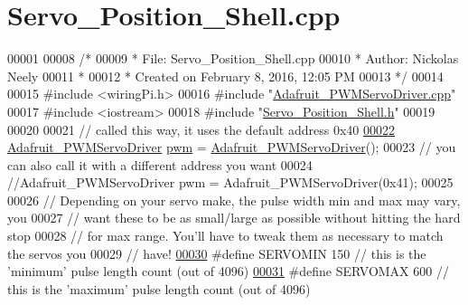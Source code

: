 \hypertarget{Servo__Position__Shell_8cpp_source}{\section{Servo\+\_\+\+Position\+\_\+\+Shell.\+cpp}
\label{Servo__Position__Shell_8cpp_source}
}

\begin{DoxyCode}
00001 
00008 \textcolor{comment}{/* }
00009 \textcolor{comment}{ * File:   Servo\_Position\_Shell.cpp}
00010 \textcolor{comment}{ * Author: Nickolas Neely}
00011 \textcolor{comment}{ *}
00012 \textcolor{comment}{ * Created on February 8, 2016, 12:05 PM}
00013 \textcolor{comment}{ */}
00014 
00015 \textcolor{preprocessor}{#include <wiringPi.h>}
00016 \textcolor{preprocessor}{#include "\hyperlink{Adafruit__PWMServoDriver_8cpp}{Adafruit\_PWMServoDriver.cpp}"}
00017 \textcolor{preprocessor}{#include <iostream>}
00018 \textcolor{preprocessor}{#include "\hyperlink{Servo__Position__Shell_8h}{Servo\_Position\_Shell.h}"}
00019 
00020 
00021 \textcolor{comment}{// called this way, it uses the default address 0x40}
\hypertarget{Servo__Position__Shell_8cpp_source_l00022}{}\hyperlink{Servo__Position__Shell_8cpp_a2c06cc8f85429bb0f7cb91917164dc54}{00022} \hyperlink{classAdafruit__PWMServoDriver}{Adafruit\_PWMServoDriver} \hyperlink{Servo__Position__Shell_8cpp_a2c06cc8f85429bb0f7cb91917164dc54}{pwm} = \hyperlink{classAdafruit__PWMServoDriver}{Adafruit\_PWMServoDriver}();
00023 \textcolor{comment}{// you can also call it with a different address you want}
00024 \textcolor{comment}{//Adafruit\_PWMServoDriver pwm = Adafruit\_PWMServoDriver(0x41);}
00025 
00026 \textcolor{comment}{// Depending on your servo make, the pulse width min and max may vary, you }
00027 \textcolor{comment}{// want these to be as small/large as possible without hitting the hard stop}
00028 \textcolor{comment}{// for max range. You'll have to tweak them as necessary to match the servos you}
00029 \textcolor{comment}{// have!}
\hypertarget{Servo__Position__Shell_8cpp_source_l00030}{}\hyperlink{Servo__Position__Shell_8cpp_a65ff49a6e78be84de6e478345b32b508}{00030} \textcolor{preprocessor}{#define SERVOMIN  150 // this is the 'minimum' pulse length count (out of 4096)}
\hypertarget{Servo__Position__Shell_8cpp_source_l00031}{}\hyperlink{Servo__Position__Shell_8cpp_a357a7e9fa4e4d8ed2f5ef82f37143836}{00031} \textcolor{preprocessor}{#define SERVOMAX  600 // this is the 'maximum' pulse length count (out of 4096)}

\end{DoxyCode}
